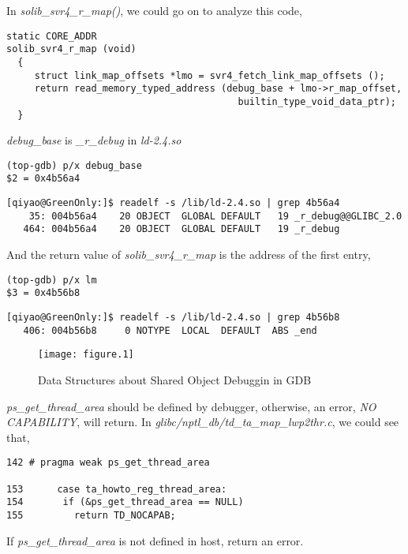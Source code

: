 \documentclass[12pt]{book}
\begin{document}
\begin{CJK}{UTF8}{gbsn}
In \emph{solib\_svr4\_r\_map()}, we could go on to analyze this code,
\begin{verbatim}
static CORE_ADDR
solib_svr4_r_map (void)
  {
     struct link_map_offsets *lmo = svr4_fetch_link_map_offsets ();
     return read_memory_typed_address (debug_base + lmo->r_map_offset,
                                         builtin_type_void_data_ptr);
  }
\end{verbatim}
\emph{debug\_base} is \emph{\_r\_debug} in \emph{ld-2.4.so}
\begin{verbatim}
(top-gdb) p/x debug_base
$2 = 0x4b56a4
\end{verbatim}
\begin{verbatim}
[qiyao@GreenOnly:]$ readelf -s /lib/ld-2.4.so | grep 4b56a4
    35: 004b56a4    20 OBJECT  GLOBAL DEFAULT   19 _r_debug@@GLIBC_2.0
   464: 004b56a4    20 OBJECT  GLOBAL DEFAULT   19 _r_debug
\end{verbatim}

And the return value of \emph{solib\_svr4\_r\_map} is the address of the first entry,
\begin{verbatim}
(top-gdb) p/x lm
$3 = 0x4b56b8
\end{verbatim}
\begin{verbatim}
[qiyao@GreenOnly:]$ readelf -s /lib/ld-2.4.so | grep 4b56b8
   406: 004b56b8     0 NOTYPE  LOCAL  DEFAULT  ABS _end
\end{verbatim}

\begin{figure}[htb]
\centering

\texttt{[image: figure.1]}
\caption{Data Structures about Shared Object Debuggin in GDB}
\label{sods}
\end{figure}

\emph{ps\_get\_thread\_area} should be defined by debugger, otherwise, an error, \emph{NO CAPABILITY}, will return.
In \emph{glibc/nptl\_db/td\_ta\_map\_lwp2thr.c}, we could see that,
\begin{verbatim}
142 # pragma weak ps_get_thread_area

153      case ta_howto_reg_thread_area:
154       if (&ps_get_thread_area == NULL)
155         return TD_NOCAPAB;
\end{verbatim}
If \emph{ps\_get\_thread\_area} is not defined in host, return an error.





\renewcommand{\bibname}{Reference}



\end{CJK}
\end{document}
